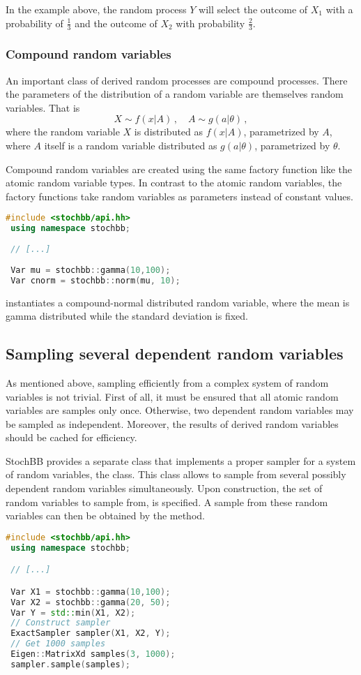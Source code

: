 In the example above, the random process $Y$ will select the outcome of $X_1$ with
a probability of $\frac{1}{3}$ and the outcome of $X_2$ with probability
$\frac{2}{3}$.

\subsubsection{Compound random variables}
An important class of derived random processes are compound processes. There the parameters of the
distribution of a random variable are themselves random variables. That is
\begin{equation}
 X \sim f(x|A)\,,\quad A \sim g(a|\theta)\,, \nonumber
\end{equation}
where the random variable $X$ is distributed as $f(x|A)$, parametrized by $A$,
where $A$ itself is a random variable distributed as $g(a|\theta)$, parametrized by
$\theta$. 

Compound random variables are created using the same factory function like the atomic random variable
types. In contrast to the atomic random variables, the factory functions take random variables as 
parameters instead of constant values.
\begin{lstlisting}[language=C++]
 #include <stochbb/api.hh>
 using namespace stochbb;
 
 // [...]
 
 Var mu = stochbb::gamma(10,100);
 Var cnorm = stochbb::norm(mu, 10);
\end{lstlisting}
instantiates a compound-normal distributed random variable, where the mean is gamma distributed
while the standard deviation is fixed.

\subsection{Sampling several dependent random variables}
As mentioned above, sampling efficiently from a complex system of random variables is not trivial. 
First of all, it must be ensured that all atomic random variables are samples only once. Otherwise, two dependent
random variables may be sampled as independent. Moreover, the results of derived random variables
should be cached for efficiency. 

StochBB provides a separate class that implements a proper sampler for a system
of random variables, the  class. This class allows to sample
from several possibly dependent random variables simultaneously. Upon construction,
the set of random variables to sample from, is specified. A sample from these random
variables can then be obtained by the  method.
\begin{lstlisting}[language=C++]
 #include <stochbb/api.hh>
 using namespace stochbb;

 // [...]

 Var X1 = stochbb::gamma(10,100);
 Var X2 = stochbb::gamma(20, 50);
 Var Y = std::min(X1, X2);
 // Construct sampler
 ExactSampler sampler(X1, X2, Y);
 // Get 1000 samples
 Eigen::MatrixXd samples(3, 1000);
 sampler.sample(samples);
\end{lstlisting}

